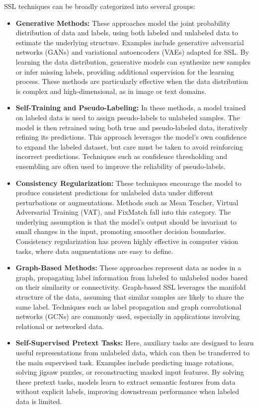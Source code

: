 SSL techniques can be broadly categorized into several groups:

\begin{itemize}
    \item \textbf{Generative Methods:} These approaches model the joint probability distribution of data and labels, using both labeled and unlabeled data to estimate the underlying structure. Examples include generative adversarial networks (GANs) and variational autoencoders (VAEs) adapted for SSL. By learning the data distribution, generative models can synthesize new samples or infer missing labels, providing additional supervision for the learning process. These methods are particularly effective when the data distribution is complex and high-dimensional, as in image or text domains.

    \item \textbf{Self-Training and Pseudo-Labeling:} In these methods, a model trained on labeled data is used to assign pseudo-labels to unlabeled samples. The model is then retrained using both true and pseudo-labeled data, iteratively refining its predictions. This approach leverages the model's own confidence to expand the labeled dataset, but care must be taken to avoid reinforcing incorrect predictions. Techniques such as confidence thresholding and ensembling are often used to improve the reliability of pseudo-labels.

    \item \textbf{Consistency Regularization:} These techniques encourage the model to produce consistent predictions for unlabeled data under different perturbations or augmentations. Methods such as Mean Teacher, Virtual Adversarial Training (VAT), and FixMatch fall into this category. The underlying assumption is that the model's output should be invariant to small changes in the input, promoting smoother decision boundaries. Consistency regularization has proven highly effective in computer vision tasks, where data augmentations are easy to define.

    \item \textbf{Graph-Based Methods:} These approaches represent data as nodes in a graph, propagating label information from labeled to unlabeled nodes based on their similarity or connectivity. Graph-based SSL leverages the manifold structure of the data, assuming that similar samples are likely to share the same label. Techniques such as label propagation and graph convolutional networks (GCNs) are commonly used, especially in applications involving relational or networked data.

    \item \textbf{Self-Supervised Pretext Tasks:} Here, auxiliary tasks are designed to learn useful representations from unlabeled data, which can then be transferred to the main supervised task. Examples include predicting image rotations, solving jigsaw puzzles, or reconstructing masked input features. By solving these pretext tasks, models learn to extract semantic features from data without explicit labels, improving downstream performance when labeled data is limited.
\end{itemize}

